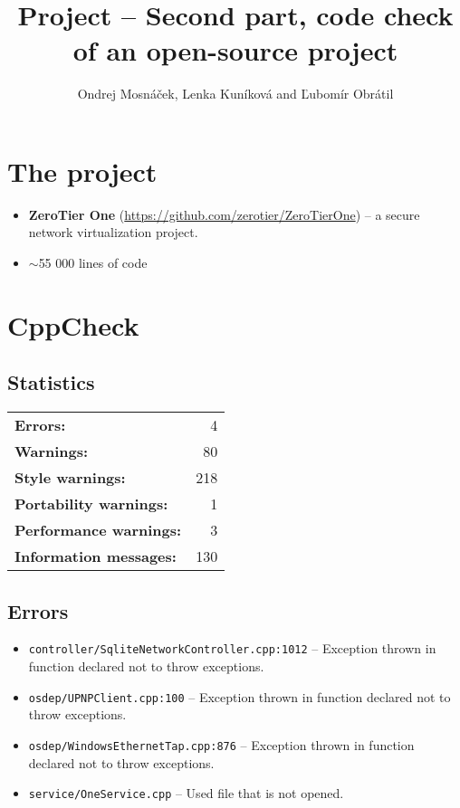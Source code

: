 \documentclass[10pt,a4paper]{article}
\author{Ondrej Mosnáček, Lenka Kuníková and Ľubomír Obrátil}
\title{Project -- Second part, code check of an open-source project}
\begin{document}
\maketitle

\section*{The project}
\begin{itemize}
\item \textbf{ZeroTier One} (\url{https://github.com/zerotier/ZeroTierOne}) -- a secure network virtualization project.
\item $\sim$55 000 lines of code
\end{itemize}
\section*{CppCheck}
\subsection*{Statistics}
\begin{tabular}{lr}
\textbf{Errors:} & 4 \\
\textbf{Warnings:} & 80 \\
\textbf{Style warnings:} & 218 \\
\textbf{Portability warnings:} & 1 \\
\textbf{Performance warnings:} & 3 \\
\textbf{Information messages:} & 130
\end{tabular}

\subsection*{Errors}
\begin{itemize}
\item \verb|controller/SqliteNetworkController.cpp:1012| -- Exception thrown in function declared not to throw exceptions.
\item \verb|osdep/UPNPClient.cpp:100| -- Exception thrown in function declared not to throw exceptions.
\item \verb|osdep/WindowsEthernetTap.cpp:876| -- Exception thrown in function declared not to throw exceptions.
\item \verb|service/OneService.cpp| -- Used file that is not opened.
\end{itemize}
\end{document}
